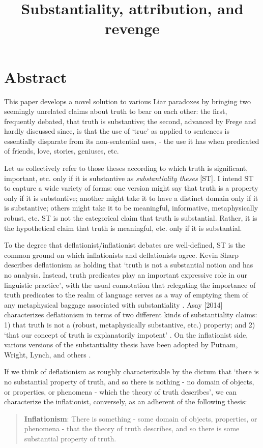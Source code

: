 \documentclass[]{birkjour}
\title{Substantiality, attribution, and revenge}
\author{}
\begin{document}
\maketitle

\section{Abstract}
This paper develops a novel solution to various Liar paradoxes by bringing two seemingly unrelated claims about truth to bear on each other: the first, frequently debated, that truth is substantive; the second, advanced by Frege \cite{Frege1956} and hardly discussed since, is that the use of `true' as applied to sentences is essentially disparate from its non-sentential uses, - the use it has when predicated of friends, love, stories, geniuses, etc.

Let us collectively refer to those theses according to which truth is significant, important, etc. only if it is substantive as \textit{substantiality theses} [ST]. I intend ST to capture a wide variety of forms: one version might say that truth is a property only if it is substantive; another might take it to have a distinct domain only if it is substantive; others might take it to be meaningful, informative, metaphysically robust, etc. ST is not the categorical claim that truth is substantial. Rather, it is the hypothetical claim that truth is meaningful, etc. only if it is substantial.

To the degree that deflationist/inflationist debates are well-defined, ST is the common ground on which inflationists and deflationists agree. Kevin Sharp describes deflationism as holding that `truth is not a substantial notion and has no analysis. Instead, truth predicates play an important expressive role in our linguistic practice',  with the usual connotation that relegating the importance of truth predicates to the realm of language serves as a way of emptying them of any metaphysical baggage associated with substantiality \cite[13]{Sharp2013}. Asay [2014] characterizes deflationism in terms of two different kinds of substantiality claims: 1) that truth is not a (robust, metaphysically substantive, etc.) property; and 2) `that our concept of truth is explanatorily impotent' \cite[148]{Asay2014}.  On the inflationist side, various versions of the substantiality thesis have been adopted by Putnam, Wright, Lynch, and others \cite{Putnam1994,Wright2001,Lynch2009}.

If  we think of deflationism as roughly characterizable by the dictum that `there is no substantial property of truth, and so there is nothing - no domain of objects, or properties, or phenomena - which the theory of truth describes',\cite[13]{Glanzberg2003}  we can characterize the inflationist, conversely, as an adherent of the following thesis:
\begin{quote}
\textbf{Inflationism}: There is something - some domain of objects, properties, or phenomena - that the theory of truth describes, and so there is some substantial property of truth.
\end{quote}
\end{document}
